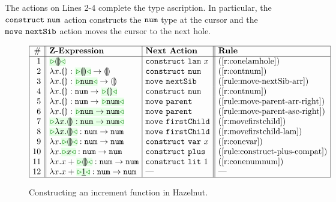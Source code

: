 The actions on Lines 2-4 complete the type ascription. In particular, the $\mathtt{construct}~\mathtt{num}$ action constructs the $\texttt{num}$ type at the cursor and the $\mathtt{move}~\mathtt{nextSib}$ action moves the cursor to the next hole.



\begin{figure}[t!]
\begin{center}
$\arraycolsep=4px
\begin{array}{|r||l|l||l|l|}
\hline
\# & \textbf{Z-Expression} & 
\textbf{Next Action} & \textbf{Rule}
\\
\hline
1 &
\zwsel{\hhole{}} & 
\aConstruct{\flam{x}} & 
\text{(\ref{r:conelamhole})}
\\ 2 &
\hlam{x}{\hhole{}} : \tarr{\zwsel{\hhole{}}}{\hhole{}} & 
\aConstruct{\fnum{}} &
\text{(\ref{r:contnum})}
\\ 3 &
\hlam{x}{\hhole{}} : \tarr{\zwsel{\tnum{}}}{\hhole{}} &
\aMove{\dNext{}} & 
\text{({\ref{rule:move-nextSib-arr}})}
\\ 4 &
\hlam{x}{\hhole{}} : \tarr{\tnum}{\zwsel{\hhole{}}}
&
\aConstruct{\fnum{}} & 
\text{(\ref{r:contnum})}
\\ 5 &
\hlam{x}{\hhole{}} : \tarr{\tnum{}}{\zwsel{\tnum{}}} & 
\aMove{\dParent{}} & 
\text{(\ref{rule:move-parent-arr-right})}
\\ 6 &
\hlam{x}{\hhole{}} : \zwsel{\tarr{\tnum{}}{\tnum{}}}
&
\aMove{\dParent{}} & 
\text{(\ref{rule:move-parent-asc-right})}
\\ 7 & 
\zwsel{\hlam{x}{\hhole{}} : \tarr{\tnum}{\tnum}} & 
\aMove{\dChild} & 
\text{(\ref{r:movefirstchild})}
\\ 8 &
\zwsel{\hlam{x}{\hhole{}}} : \tarr{\tnum{}}{\tnum{}} & 
\aMove{\dChild{}} & 
\text{(\ref{r:movefirstchild-lam})}
\\ 9 &
\hlam{x}{\zwsel{\hhole{}}} : \tarr{\tnum{}}{\tnum{}} &
\aConstruct{\fvar{x}} & 
\text{(\ref{r:conevar})}
\\ 10 &
\hlam{x}{\zwsel{{x}}} : \tarr{\tnum{}}{\tnum{}} &
{\aConstruct{\fplus}}
&
\text{(\ref{rule:construct-plus-compat})}
\\ 11 & 
\hlam{x}{\hadd{x}{\zwsel{\hhole{}}}} : \tarr{\tnum{}}{\tnum{}} & 
\aConstruct{\fnumlit{1}} & 
\text{(\ref{r:conenumnum})}
\\ 12 & 
\hlam{x}{\hadd{x}{\zwsel{\hnum{1}}}} : \tarr{\tnum}{\tnum} & 
\textrm{---} & 
{\textrm{---}}
\\ \hline
\end{array}
$\end{center}\vspace{-6px}
\caption{Constructing an increment function in Hazelnut.}
\label{fig:first-example}
\end{figure}

